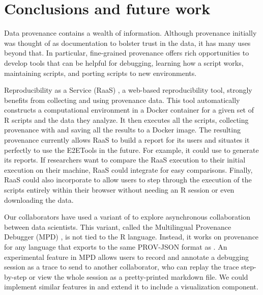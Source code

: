 

\section{Conclusions and future work}

Data provenance contains a wealth of information. Although provenance initially was thought of as documentation to bolster trust in the data, it has many uses beyond that. In particular, fine-grained provenance offers rich opportunities to develop tools that can be helpful for debugging, learning how a script works, maintaining scripts, and porting scripts to new environments.

Reproducibility as a Service (RaaS) \citep{wonsil2021raas}, a web-based reproducibility tool, strongly benefits from collecting and using provenance data. This tool automatically constructs a computational environment in a Docker container for a given set of R scripts and the data they analyze. It then executes all the scripts, collecting provenance with  and saving all the results to a Docker image. The resulting provenance currently allows RaaS to build a report for its users and situates it perfectly to use the E2ETools in the future. For example, it could use  to generate its reports. If researchers want to compare the RaaS execution to their initial execution on their machine, RaaS could integrate  for easy comparisons. Finally, RaaS could also incorporate  to allow users to step through the execution of the scripts entirely within their browser without needing an R session or even downloading the data. 

Our collaborators have used a variant of  to explore asynchronous collaboration between data scientists. This variant, called the Multilingual Provenance Debugger (MPD) \citep{[mpd2021]}, is not tied to the R language. Instead, it works on provenance for any language that exports to the same PROV-JSON format as . An experimental feature in MPD allows users to record and annotate a debugging session as a trace to send to another collaborator, who can replay the trace step-by-step or view the whole session as a pretty-printed markdown file. We could implement similar features in  and extend it to include a visualization component.

